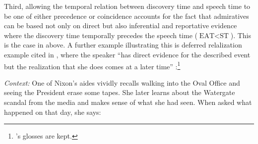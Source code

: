 \documentclass[output=paper,
colorlinks,
citecolor=brown,
newtxmath
]{langscibook}
\begin{document}

Third, allowing the temporal relation between discovery time and speech time to be one of either precedence or coincidence accounts for the fact that admiratives can be based not only on direct but also inferential and reportative evidence where the discovery time temporally precedes the speech time ($\text{EAT}<\text{ST}$). This is the case in  above. A further example illustrating this is  deferred relalization example cited in , where the speaker ``has direct evidence for the described event but the realization that she does comes at a later time'' \citep[4]{Koev2017}:\footnote{\citeauthor{Koev2017}'s glosses are kept.}

\eanoraggedright\label{ex:late-realization}\textit{Context:} One of Nixon's aides vividly recalls walking into the Oval Office and seeing the President erase some tapes. She later learns about the Watergate scandal from the media and makes sense of what she had seen. When asked what happened on that day, she says:\vspace{-6pt}
\z
\begin{exe}
\end{exe}
\end{document}
